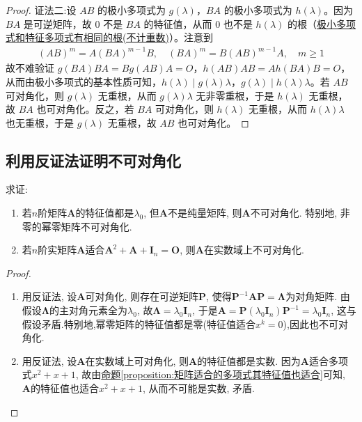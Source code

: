 \documentclass[../../main.tex]{subfiles}
\begin{document}
\begin{proof}
{\color{blue}证法二:}设 $AB$ 的极小多项式为 $g(\lambda)$，$BA$ 的极小多项式为 $h(\lambda)$。因为 $BA$ 是可逆矩阵，故 $0$ 不是 $BA$ 的特征值，从而 $0$ 也不是 $h(\lambda)$ 的根（\hyperref[corollary:极小多项式和特征多项式有相同的根(不计重数)]{极小多项式和特征多项式有相同的根(不计重数)}）。注意到
\begin{align*}
(AB)^m = A(BA)^{m - 1}B, \quad (BA)^m = B(AB)^{m - 1}A, \quad m\geqslant  1
\end{align*}
故不难验证 $g(BA)BA = Bg(AB)A = O$，$h(AB)AB = Ah(BA)B = O$，从而由极小多项式的基本性质可知，$h(\lambda)\mid g(\lambda)\lambda$，$g(\lambda)\mid h(\lambda)\lambda$。若 $AB$ 可对角化，则 $g(\lambda)$ 无重根，从而 $g(\lambda)\lambda$ 无非零重根，于是 $h(\lambda)$ 无重根，故 $BA$ 也可对角化。反之，若 $BA$ 可对角化，则 $h(\lambda)$ 无重根，从而 $h(\lambda)\lambda$ 也无重根，于是 $g(\lambda)$ 无重根，故 $AB$ 也可对角化。
\end{proof}

\subsection{利用反证法证明不可对角化}

\begin{example}\label{example-0.10}
求证:
\begin{enumerate}[(1)]
\item 若\(n\)阶矩阵\(\boldsymbol{A}\)的特征值都是\(\lambda_0\), 但\(\boldsymbol{A}\)不是纯量矩阵, 则\(\boldsymbol{A}\)不可对角化. 特别地, 非零的幂零矩阵不可对角化.

\item 若\(n\)阶实矩阵\(\boldsymbol{A}\)适合\(\boldsymbol{A}^2 + \boldsymbol{A} + \boldsymbol{I}_n = \boldsymbol{O}\), 则\(\boldsymbol{A}\)在实数域上不可对角化.
\end{enumerate}
\end{example}
\begin{proof}
\begin{enumerate}[(1)]
\item 用反证法, 设\(\boldsymbol{A}\)可对角化, 则存在可逆矩阵\(\boldsymbol{P}\), 使得\(\boldsymbol{P}^{-1}\boldsymbol{A}\boldsymbol{P} = \boldsymbol{\Lambda}\)为对角矩阵. 由假设\(\boldsymbol{\Lambda}\)的主对角元素全为\(\lambda_0\), 故\(\boldsymbol{\Lambda} = \lambda_0\boldsymbol{I}_n\), 于是\(\boldsymbol{A} = \boldsymbol{P}(\lambda_0\boldsymbol{I}_n)\boldsymbol{P}^{-1} = \lambda_0\boldsymbol{I}_n\), 这与假设矛盾.特别地,幂零矩阵的特征值都是零(特征值适合$x^k=0$),因此也不可对角化.

\item 用反证法, 设\(\boldsymbol{A}\)在实数域上可对角化, 则\(\boldsymbol{A}\)的特征值都是实数. 因为\(\boldsymbol{A}\)适合多项式\(x^2 + x + 1\), 故由\hyperref[proposition:矩阵适合的多项式其特征值也适合]{命题\ref{proposition:矩阵适合的多项式其特征值也适合}}可知, \(\boldsymbol{A}\)的特征值也适合\(x^2 + x + 1\), 从而不可能是实数, 矛盾.
\end{enumerate}
\end{proof}
\end{document}
